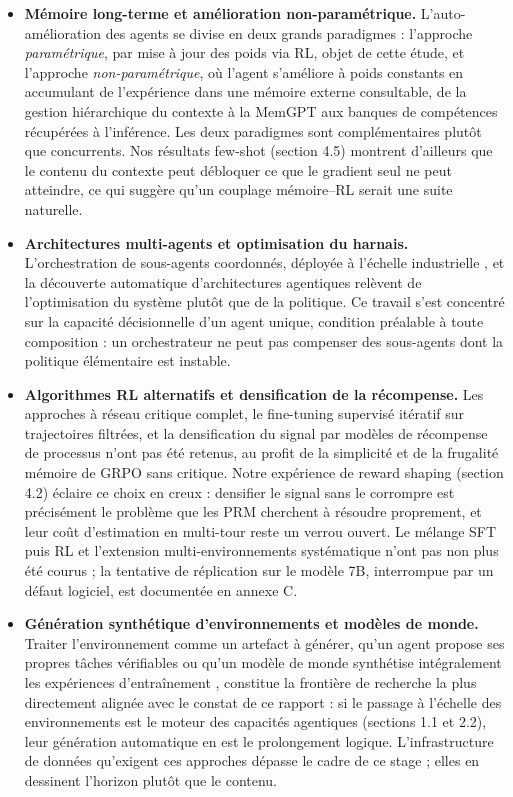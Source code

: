 \documentclass[11pt,a4paper]{article}
\begin{document}
\begin{itemize}
    \item \textbf{Mémoire long-terme et amélioration non-paramétrique.} L'auto-amélioration des agents se divise en deux grands paradigmes : l'approche \emph{paramétrique}, par mise à jour des poids via RL, objet de cette étude, et l'approche \emph{non-paramétrique}, où l'agent s'améliore à poids constants en accumulant de l'expérience dans une mémoire externe consultable, de la gestion hiérarchique du contexte à la MemGPT \cite{packer_memgpt_2023} aux banques de compétences récupérées à l'inférence. Les deux paradigmes sont complémentaires plutôt que concurrents. Nos résultats few-shot (section 4.5) montrent d'ailleurs que le contenu du contexte peut débloquer ce que le gradient seul ne peut atteindre, ce qui suggère qu'un couplage mémoire--RL serait une suite naturelle.
    \item \textbf{Architectures multi-agents et optimisation du harnais.} L'orchestration de sous-agents coordonnés, déployée à l'échelle industrielle \cite{kimi_k25_2026}, et la découverte automatique d'architectures agentiques \cite{hu_adas_2025} relèvent de l'optimisation du système plutôt que de la politique. Ce travail s'est concentré sur la capacité décisionnelle d'un agent unique, condition préalable à toute composition : un orchestrateur ne peut pas compenser des sous-agents dont la politique élémentaire est instable.
    \item \textbf{Algorithmes RL alternatifs et densification de la récompense.} Les approches à réseau critique complet, le fine-tuning supervisé itératif sur trajectoires filtrées, et la densification du signal par modèles de récompense de processus \cite{lightman2023verify} n'ont pas été retenus, au profit de la simplicité et de la frugalité mémoire de GRPO sans critique. Notre expérience de reward shaping (section 4.2) éclaire ce choix en creux : densifier le signal sans le corrompre est précisément le problème que les PRM cherchent à résoudre proprement, et leur coût d'estimation en multi-tour reste un verrou ouvert. Le mélange SFT puis RL et l'extension multi-environnements systématique n'ont pas non plus été courus ; la tentative de réplication sur le modèle 7B, interrompue par un défaut logiciel, est documentée en annexe C.
    \item \textbf{Génération synthétique d'environnements et modèles de monde.} Traiter l'environnement comme un artefact à générer, qu'un agent propose ses propres tâches vérifiables \cite{zhou2025sca} ou qu'un modèle de monde synthétise intégralement les expériences d'entraînement \cite{dreamgym2025}, constitue la frontière de recherche la plus directement alignée avec le constat de ce rapport : si le passage à l'échelle des environnements est le moteur des capacités agentiques (sections 1.1 et 2.2), leur génération automatique en est le prolongement logique. L'infrastructure de données qu'exigent ces approches dépasse le cadre de ce stage ; elles en dessinent l'horizon plutôt que le contenu.
\end{itemize}
\end{document}
